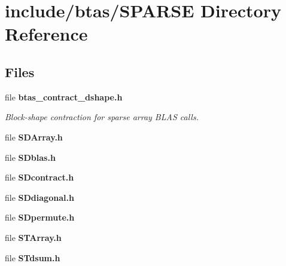 \section{include/btas/\-S\-P\-A\-R\-S\-E Directory Reference}
\label{dir_f7c1f1a6da3cf2e5d2b798edcecf4014}
\subsection*{Files}
\begin{DoxyCompactItemize}
\item 
file {\bf btas\-\_\-contract\-\_\-dshape.\-h}
\begin{DoxyCompactList}\small\item\em Block-\/shape contraction for sparse array B\-L\-A\-S calls. \end{DoxyCompactList}\item 
file {\bf S\-D\-Array.\-h}
\item 
file {\bf S\-Dblas.\-h}
\item 
file {\bf S\-Dcontract.\-h}
\item 
file {\bf S\-Ddiagonal.\-h}
\item 
file {\bf S\-Dpermute.\-h}
\item 
file {\bf S\-T\-Array.\-h}
\item 
file {\bf S\-Tdsum.\-h}
\end{DoxyCompactItemize}
